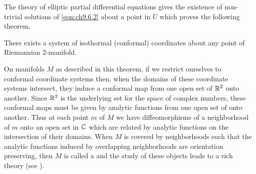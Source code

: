 \documentclass[../main]{subfiles}
\begin{document}
The theory of elliptic partial differential equations gives the existence of non-trivial solutions of \eqref{eqn:ch9.6.2} about a point in $U$ which proves the following theorem.



\begin{theorem} \label{thm:ch9.6.1}
There exists a system of isothormal (conformal) coordinates about any point of Riemannian 2-manifold.

On manifolds $M$ as described in this theorem, if we restrict ourselves to conformal coordinate systems then, when the domains of these coordinate systems intersect, they induce a conformal map from one open set of $\mathbb{R}^2$ onto another. Since $\mathbb{R}^2$ is the underlying set for the space of complex numbers, these conformal maps must be given by analytic functions from one open set of  onto another. Thus at each point $m$ of $M$ we have diffeomorphisms of a neighborhood of $m$ onto an open set in $\mathbb{C}$ which are related by analytic functions on the intersection of their domains. When $M$ is covered by neighborhoods such that the analytic functions induced by overlapping neighborhoods are orientation preserving, then $M$ is called a  and the study of these objects leads to a rich theory (see  \cite{ahlfors1960riemann}).
\end{theorem}
\end{document}
